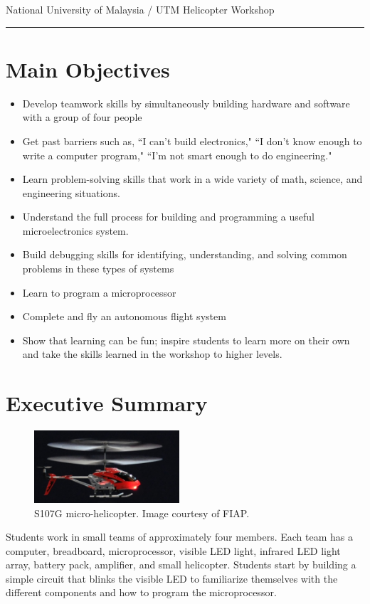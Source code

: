 \documentclass[11pt]{article}
\begin{document}

{\LARGE National University of Malaysia / UTM Helicopter Workshop}
\hrule

\section*{Main Objectives}

\begin{itemize}
    \item Develop teamwork skills by simultaneously building hardware and software with a group of four people
    \item Get past barriers such as, ``I can’t build electronics," ``I don’t know enough to write a computer program," ``I'm not smart enough to do engineering."
    \item Learn problem-solving skills that work in a wide variety of math, science, and engineering situations.
    \item Understand the full process for building and programming a useful microelectronics system.
    \item Build debugging skills for identifying, understanding, and solving common problems in these types of systems
    \item Learn to program a microprocessor
    \item Complete and fly an autonomous flight system
    \item Show that learning can be fun; inspire students to learn more on their own and take the skills learned in the workshop to higher levels.
\end{itemize}

\section*{Executive Summary}
\begin{figure}
  \begin{center}
    \includegraphics[width=0.48\textwidth]{figures/S107G.jpg}
    \caption{S107G micro-helicopter. Image courtesy of FIAP.}
  \end{center}
\end{figure}
Students work in small teams of approximately four members.  Each team has a computer, breadboard, microprocessor, visible LED light, infrared LED light array, battery pack, amplifier, and small helicopter.  Students start by building a simple circuit that blinks the visible LED to familiarize themselves with the different components and how to program the microprocessor.
\end{document}
